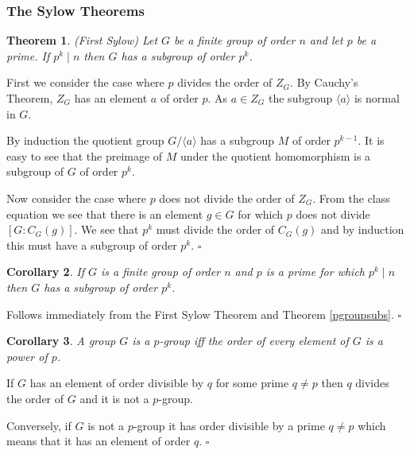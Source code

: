 \documentclass[10pt]{article}
\newtheorem{theorem}{Theorem}[section]
\newtheorem{corollary}[theorem]{Corollary}
\newenvironment{proof}[1][Proof]{\begin{trivlist}
\item[\hskip \labelsep {\itshape #1}]}{\end{trivlist}}
\begin{document}
\subsubsection{The Sylow Theorems}

\begin{theorem} (First Sylow)
Let $G$ be a finite group of order $n$ and let $p$ be a prime. If $p^k \;|\; n$ then $G$ has a subgroup of order $p^k$.
\end{theorem}

\begin{proof}
First we consider the case where $p$ divides the order of $Z_G$. By Cauchy's Theorem, $Z_G$ has an element $a$ of order $p$. As $a \in Z_G$ the subgroup $\langle a \rangle$ is normal in $G$.

By induction the quotient group $G/\langle a \rangle$ has a subgroup $M$ of order $p^{k-1}$. It is easy to see that the preimage of $M$ under the quotient homomorphism is a subgroup of $G$ of order $p^k$.

Now consider the case where $p$ does not divide the order of $Z_G$. From the class equation we see that there is an element $g \in G$ for which $p$ does not divide $[G:C_G(g)]$. We see that $p^k$ must divide the order of $C_G(g)$ and by induction this must have a subgroup of order $p^k$. $\square$
\end{proof}

\begin{corollary}
If $G$ is a finite group of order $n$ and $p$ is a prime for which $p^k \;|\; n$ then $G$ has a subgroup of order $p^k$.
\end{corollary}

\begin{proof}
Follows immediately from the First Sylow Theorem and Theorem \ref{pgroupsubs}. $\square$
\end{proof}

\begin{corollary}
A group $G$ is a $p$-group iff the order of every element of $G$ is a power of $p$.
\end{corollary}

\begin{proof}
If $G$ has an element of order divisible by $q$ for some prime $q \neq p$ then $q$ divides the order of $G$ and it is not a $p$-group.

Conversely, if $G$ is not a $p$-group it has order divisible by a prime $q \neq p$ which means that it has an element of order $q$. $\square$
\end{proof}
\end{document}
